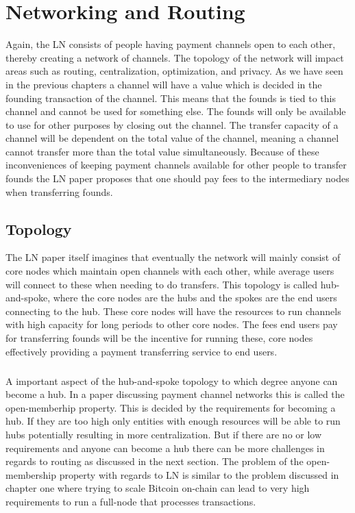 \documentclass[informationsecurity]{gucmasterproject}
\begin{document}
\chapter{Networking and Routing}

Again, the LN consists of people having payment channels open to each other, thereby creating a network of channels. The topology of the network will impact areas such as routing, centralization, optimization, and privacy.  As we have seen in the previous chapters a channel will have a value which is decided in the founding transaction of the channel. This means that  the founds is tied to this channel and cannot be used for something else. The founds will only be available to use for other purposes by closing out the channel. The transfer capacity of a channel will be dependent on the total value of the channel, meaning a channel cannot transfer more than the total value simultaneously. Because of these inconveniences of keeping payment channels available for other people to transfer founds the LN paper\cite{poon2015bitcoin} proposes that one should pay fees to the intermediary nodes when transferring founds. 

\section{Topology}
The LN paper itself\cite{poon2015bitcoin} imagines that eventually the network will mainly consist of core nodes which maintain open channels with each other, while average users will connect to these when needing to do transfers. This topology is called hub-and-spoke, where the core nodes are the hubs and the spokes are the end users connecting to the hub. These core nodes will have the resources to run channels with high capacity for long periods to other core nodes. The fees end users pay for transferring founds will be the incentive for running these, core nodes effectively providing a payment transferring service to end users. 

\paragraph{}
A important aspect of the hub-and-spoke topology to which degree anyone can become a hub.
In a paper discussing payment channel networks\cite{mccorry2016towards} this is called the open-memberhip property.
This is decided by the requirements for becoming a hub. 
If they are too high only entities with enough resources will be able to run hubs potentially resulting in more centralization.
But if there are no or low requirements and anyone can become a hub there can be more challenges in regards to routing as discussed in the next section. The problem of the open-membership property with regards to LN is similar to the problem discussed in chapter one where trying to scale Bitcoin on-chain can lead to very high requirements to run a full-node that processes transactions. 
\end{document}
